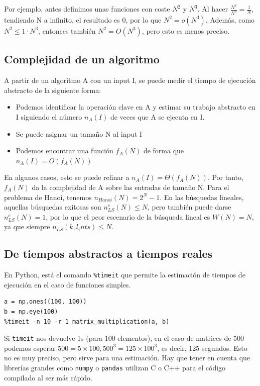 Por ejemplo, antes definimos unas funciones con coste $N^2$ y $N^3$. Al hacer $\frac{N^2}{N^3} = \frac{1}{N}$, tendiendo N a infinito, el resultado es 0, por lo que $N^2 = o(N^3)$. Además, como $N^2 \leq 1 \cdot N^3$, entonces también $N^2 = O(N^3)$, pero esto es menos preciso.

\subsection{Complejidad de un algoritmo}
A partir de un algoritmo A con un input I, se puede medir el tiempo de ejecución abstracto de la siguiente forma:
\begin{itemize}
\item Podemos identificar la operación clave en A y estimar su trabajo abstracto en I siguiendo el número $n_A(I)$ de veces que A se ejecuta en I.
\item Se puede asignar un tamaño N al input I
\item Podemos encontrar una función $f_A(N)$ de forma que $n_A(I) = O(f_A(N))$
\end{itemize}
En algunos casos, esto se puede refinar a $n_A(I) = \Theta(f_A(N))$. Por tanto, $f_A(N)$ da la complejidad de A sobre las entradas de tamaño N. Para el problema de Hanoi, tenemos $n_{Hanoi}(N) = 2^N - 1$. En las búsquedas lineales, aquellas búsquedas exitosas son $n^e_{LS}(N) \leq N$, pero también puede darse $n^e_{LS}(N) = 1$, por lo que el peor escenario de la búsqueda lineal es $W(N) = N$, ya que siempre $n_{LS}(k, l_ints) \leq N$.

\subsection{De tiempos abstractos a tiempos reales}
En Python, está el comando \texttt{\%timeit} que permite la estimación de tiempos de ejecución en el caso de funciones simples. 
\begin{lstlisting}
a = np.ones((100, 100))
b = np.eye(100)
%timeit -n 10 -r 1 matrix_multiplication(a, b)
\end{lstlisting}
Si \texttt{timeit} nos devuelve 1s (para 100 elementos), en el caso de matrices de 500 podemos esperar $500 = 5 \times 100, 500^3 = 125 \times 100^3$, es decir, 125 segundos. Esto no es muy preciso, pero sirve para una estimación. Hay que tener en cuenta que librerías grandes como \texttt{numpy} o \texttt{pandas} utilizan C o C++ para el código compilado al ser más rápido.